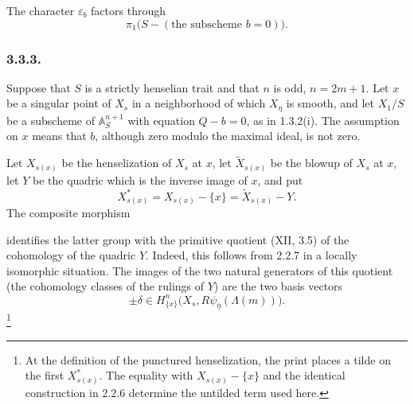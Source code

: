The character $\varepsilon_b$ factors through
\[
\pi_1\bigl(S-(\text{the subscheme }b=0)\bigr).
\]

\subsubsection*{3.3.3.}
Suppose that $S$ is a strictly henselian trait and that $n$ is odd,
$n=2m+1$.  Let $x$ be a singular point of $X_s$ in a neighborhood
of which $X_\eta$ is smooth, and let $X_1/S$ be a subscheme of
$\mathbb A^{n+1}_S$ with equation $Q-b=0$, as in 1.3.2(i).  The
assumption on $x$ means that $b$, although zero modulo the maximal
ideal, is not zero.

Let $X_{s(x)}$ be the henselization of $X_s$ at $x$, let
$\widetilde X_{s(x)}$ be the blowup of $X_s$ at $x$, let $Y$ be the
quadric which is the inverse image of $x$, and put
\[
X^*_{s(x)}=X_{s(x)}-\{x\}=\widetilde X_{s(x)}-Y.
\]
The composite morphism
\begin{center}
\end{center}
identifies the latter group with the primitive quotient (XII, 3.5)
of the cohomology of the quadric $Y$.  Indeed, this follows from
2.2.7 in a locally isomorphic situation.  The images of the two
natural generators of this quotient (the cohomology classes of the
rulings of $Y$) are the two basis vectors
\[
\pm\delta\in
H^n_{\{x\}}\bigl(X_s,R\psi_{\bar\eta}(\Lambda(m))\bigr).
\]
\footnote{At the definition of the punctured henselization, the print
places a tilde on the first $X^*_{s(x)}$.  The equality with
$X_{s(x)}-\{x\}$ and the identical construction in 2.2.6 determine
the untilded term used here.}
